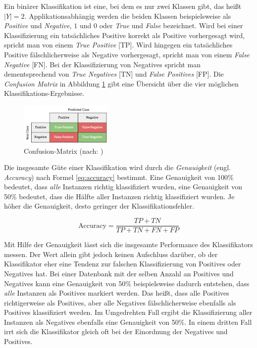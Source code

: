 Ein binärer Klassifikation ist eine, bei dem es nur zwei Klassen gibt, das heißt $|Y| = 2$. Applikationsabhängig werden die beiden Klassen beispielsweise als \emph{Positive} und \emph{Negative}, $1$ und $0$ oder \emph{True} und \emph{False} bezeichnet. Wird bei einer Klassifizierung ein tatsächliches Positive korrekt als Positive vorhergesagt wird, spricht man von einem \emph{True Positive} [TP]. Wird hingegen ein tatsächliches Positive fälschlicherweise als Negative vorhergesagt, spricht man von einem \emph{False Negative} [FN]. Bei der Klassifizierung von Negatives spricht man dementsprechend von \emph{True Negatives} [TN] und \emph{False Positives} [FP]. Die \emph{Confusion Matrix} in Abbildung \ref{img:Confusion-Matrix} gibt eine Übersicht über die vier möglichen Klassifikations-Ergebnisse. \cite[S. 213 - 214]{machine_kubat}

\begin{figure}[h]
	\centering
	\includegraphics[width=0.4\textwidth]{bilder/Confusion-Matrix02.png}
	\caption{Confusion-Matrix (nach: \cite[S. 214]{machine_kubat})}
	\label{img:Confusion-Matrix}
\end{figure}

Die insgesamte Güte einer Klassifikation wird durch die \emph{Genauigkeit} (engl. \emph{Accuracy}) nach Formel \ref{eq:accuracy} bestimmt. Eine Genauigkeit von 100\% bedeutet, dass \emph{alle} Instanzen richtig klassifiziert wurden, eine Genauigkeit von 50\% bedeutet, dass die Hälfte aller Instanzen richtig klassifiziert wurden. Je höher die Genauigkeit, desto geringer der Klassifikationsfehler. \cite[S. 214]{machine_kubat}

\begin{equation}
\text{Accuracy} = \frac{TP+TN}{TP+TN+FN+FP}
\label{eq:accuracy}
\end{equation}

Mit Hilfe der Genauigkeit lässt sich die insgesamte Performance des Klassifikators messen. Der Wert allein gibt jedoch keinen Aufschluss darüber, ob der Klassifikator eher eine Tendenz zur falschen Klassifizierung von Positives oder Negatives hat. Bei einer Datenbank mit der selben Anzahl an Positives und Negatives kann eine Genauigkeit von 50\% beispielsweise dadurch entstehen, dass \emph{alle} Instanzen als Positives markiert werden. Das heißt, dass alle Positives richtigerweise als Positives, aber alle Negatives fälschlicherweise ebenfalls als Positives klassifiziert werden. Im Umgedrehten Fall ergibt die Klassifizierung aller Instanzen als Negatives ebenfalls eine Genauigkeit von 50\%. In einem dritten Fall irrt sich die Klassifikator gleich oft bei der Einordnung der Negatives und Positives. 

